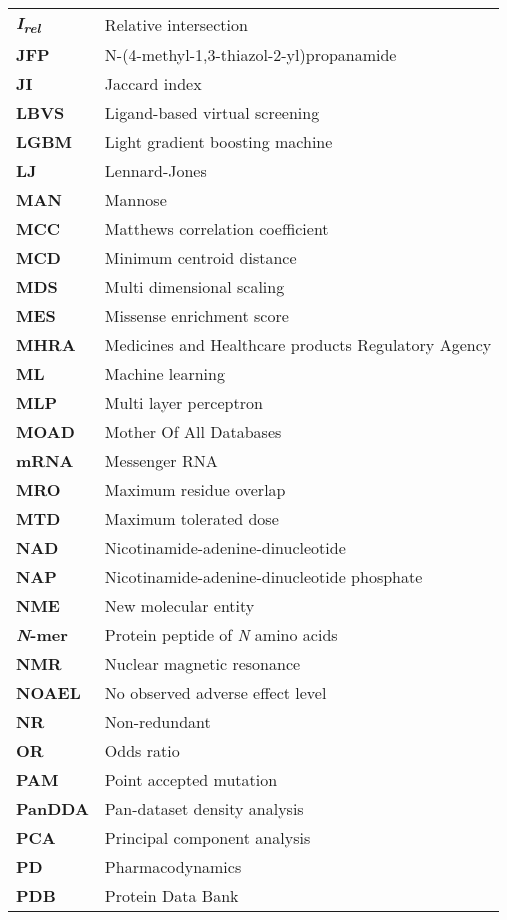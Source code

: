 \begin{longtable}[l]{@{}p{2.5cm}p{12cm}@{}}
\textbf{\textit{I\textsubscript{rel}}} & Relative intersection \\
\textbf{JFP} & N-(4-methyl-1,3-thiazol-2-yl)propanamide \\
\textbf{JI} & Jaccard index \\
\textbf{LBVS} & Ligand-based virtual screening \\
\textbf{LGBM} & Light gradient boosting machine \\
\textbf{LJ} & Lennard-Jones \\
\textbf{MAN} & Mannose \\
\textbf{MCC} & Matthews correlation coefficient \\
\textbf{MCD} & Minimum centroid distance \\
\textbf{MDS} & Multi dimensional scaling \\
\textbf{MES} & Missense enrichment score \\
\textbf{MHRA} & Medicines and Healthcare products Regulatory Agency \\
\textbf{ML} & Machine learning \\
\textbf{MLP} & Multi layer perceptron \\
\textbf{MOAD} & Mother Of All Databases \\
\textbf{mRNA} & Messenger RNA \\
\textbf{MRO} & Maximum residue overlap \\
\textbf{MTD} & Maximum tolerated dose \\
\textbf{NAD} & Nicotinamide-adenine-dinucleotide \\
\textbf{NAP} & Nicotinamide-adenine-dinucleotide phosphate \\
\textbf{NME} & New molecular entity \\
\textbf{\textit{N}-mer} & Protein peptide of \textit{N} amino acids \\
\textbf{NMR} & Nuclear magnetic resonance \\
\textbf{NOAEL} & No observed adverse effect level \\
\textbf{NR} & Non-redundant \\
\textbf{OR} & Odds ratio \\
\textbf{PAM} & Point accepted mutation \\
\textbf{PanDDA} & Pan-dataset density analysis \\
\textbf{PCA} & Principal component analysis \\
\textbf{PD} & Pharmacodynamics \\ 
\textbf{PDB} & Protein Data Bank \\

\end{longtable}
